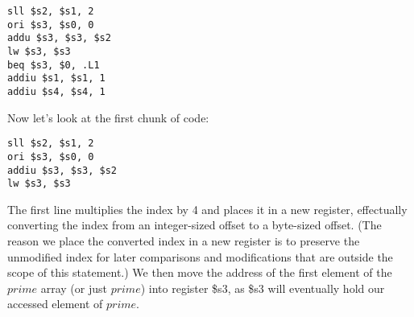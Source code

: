 \documentclass[11pt]{article}
\begin{document}
\begin{verbatim}
sll $s2, $s1, 2
ori $s3, $s0, 0
addu $s3, $s3, $s2
lw $s3, $s3
beq $s3, $0, .L1
addiu $s1, $s1, 1
addiu $s4, $s4, 1
\end{verbatim}

Now let's look at the first chunk of code:

\begin{verbatim}
sll $s2, $s1, 2
ori $s3, $s0, 0
addiu $s3, $s3, $s2
lw $s3, $s3
\end{verbatim}

The first line multiplies the index by 4 and places it in a new register, effectually converting the index from an integer-sized offset to a byte-sized offset. (The reason we place the converted index in a new register is to preserve the unmodified index for later comparisons and modifications that are outside the scope of this statement.) We then move the address of the first element of the $prime$ array (or just $prime$) into register \$s3, as \$s3 will eventually hold our accessed element of $prime$. 
\end{document}
